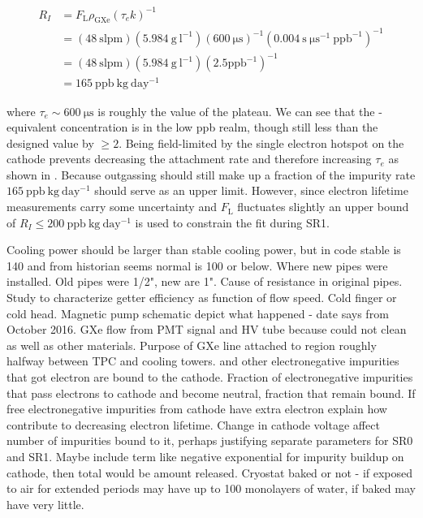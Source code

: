\begin{equation}
\begin{aligned}
R_I &= F_{\mathrm{L}} \rho_{\mathrm{GXe}} (\tau_e k)^{-1} \\
&= (48\ \mathrm{slpm}) (5.984\ \mathrm{g\ l^{-1}}) (600\ \mathrm{\mu s})^{-1} (0.004\ \mathrm{s\ \mu s^{-1}\ ppb^{-1}})^{-1} \\
&= (48\ \mathrm{slpm}) (5.984\ \mathrm{g\ l^{-1}}) (2.5 \mathrm{ppb^{-1}})^{-1} \\
&= 165\ \mathrm{ppb\ kg\ day^{-1}}
\label{eq:electron_lifetime_model_outgassing_leak}
\end{aligned}
\end{equation}

\noindent where $\tau_e \sim 600\ \mathrm{\mu s}$ is roughly the value of the plateau.  We can see that the -equivalent
concentration is in the low ppb realm, though still less than the designed value by $\geq 2$.  Being field-limited by the single electron
hotspot on the cathode prevents decreasing the attachment rate and therefore increasing $\tau_e$ as shown in
.  Because outgassing should still make up a fraction
of the impurity rate $165\ \mathrm{ppb\ kg\ day^{-1}}$  should serve as an upper limit.  However, since electron lifetime measurements
carry some uncertainty and $F_{\mathrm{L}}$ fluctuates slightly an upper bound of $R_I \leq 200\ \mathrm{ppb\ kg\ day^{-1}}$ is used to
constrain the fit during SR1.

Cooling power should be larger than stable cooling power, but in code stable is 140 and from historian seems normal is 100 or
below.  Where new pipes were installed.  Old pipes were 1/2", new are 1".  Cause of resistance in original pipes.  Study to characterize
getter efficiency as function of flow speed.  Cold finger or cold head.  Magnetic pump schematic depict what happened - date says
from October 2016.  GXe flow from PMT signal and HV tube because could not clean as well as other materials.  Purpose of GXe line
attached to region roughly halfway between TPC and cooling towers.   and other electronegative impurities that got electron
are bound to the cathode.  Fraction of electronegative impurities that pass electrons to cathode and become neutral, fraction that remain
bound.  If free electronegative impurities from cathode have extra electron explain how contribute to decreasing electron
lifetime.  Change in cathode voltage affect number of impurities bound to it, perhaps justifying separate parameters for SR0 and
SR1.  Maybe include term like negative exponential for impurity buildup on cathode, then total would be amount released.  Cryostat baked
or not - if exposed to air for extended periods may have up to 100 monolayers of water, if baked may have very little.

